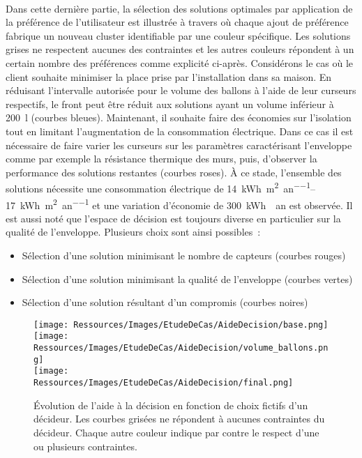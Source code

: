 \paragraph{} %
Dans cette dernière partie, la sélection des solutions optimales par application de la
préférence de l’utilisateur est illustrée à travers  où chaque
ajout de préférence fabrique un nouveau cluster identifiable par une couleur spécifique.
Les solutions grises ne respectent aucunes des contraintes et les autres couleurs répondent à
un certain nombre des préférences comme explicité ci-après. Considérons le cas où le
client souhaite minimiser la place prise par l’installation dans sa maison. En réduisant
l’intervalle autorisée pour le volume des ballons à l’aide de leur curseurs respectifs, le
front peut être réduit aux solutions ayant un volume inférieur à \SI{200}{\litre} (courbes
bleues). Maintenant, il souhaite faire des économies sur l’isolation tout en limitant
l’augmentation de la consommation électrique. Dans ce cas il est nécessaire de faire
varier les curseurs sur les paramètres caractérisant l’enveloppe comme par exemple la
résistance thermique des murs, puis, d’observer la performance des solutions restantes
(courbes roses). À ce stade, l’ensemble des solutions nécessite une consommation
électrique de \SIrange{14}{17}{kWh\per\m^{2}\per an} et une variation d’économie de
\SI{300}{kWh \per an} est observée. Il est aussi noté que l’espace de décision est
toujours diverse en particulier sur la qualité de l’enveloppe. Plusieurs choix sont ainsi
possibles~:
\begin{itemize}
  \item Sélection d’une solution minimisant le nombre de capteurs (courbes rouges)
  \item Sélection d’une solution minimisant la qualité de l’enveloppe (courbes vertes)
  \item Sélection d’une solution résultant d’un compromis (courbes noires)
\end{itemize}

\begin{figure}
    \centering
    \texttt{[image: Ressources/Images/EtudeDeCas/AideDecision/base.png]}
    \\
    \texttt{[image: Ressources/Images/EtudeDeCas/AideDecision/volume\_ballons.png]}
    \\
    \texttt{[image: Ressources/Images/EtudeDeCas/AideDecision/final.png]}
    \caption[Évolution de l’aide à la décision en fonction de choix fictif d’un décideur]
             {Évolution de l’aide à la décision en fonction de choix fictifs d’un décideur. Les courbes grisées ne répondent à
             aucunes contraintes du décideur. Chaque autre couleur indique par contre le respect d’une ou plusieurs contraintes.}
    \label{fig:xdat_exemple}
\end{figure}

